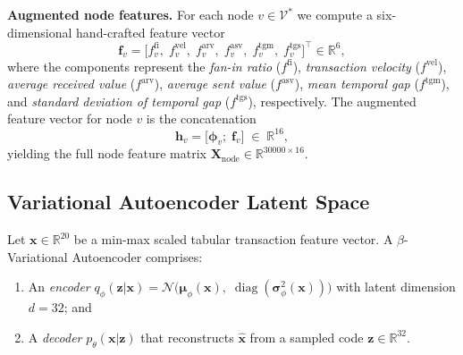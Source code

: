 \noindent\textbf{Augmented node features.}
For each node $v\in\mathcal{V}^{*}$ we compute a six-dimensional hand-crafted
feature vector
\begin{equation}
  \mathbf{f}_{v}
    = \bigl[
        f^{\mathrm{fi}}_v,\;
        f^{\mathrm{vel}}_v,\;
        f^{\mathrm{arv}}_v,\;
        f^{\mathrm{asv}}_v,\;
        f^{\mathrm{tgm}}_v,\;
        f^{\mathrm{tgs}}_v
      \bigr]^{\!\top} \in \mathbb{R}^{6},
  \label{eq:fv}
\end{equation}
where the components represent the \emph{fan-in ratio}
($f^{\mathrm{fi}}$), \emph{transaction velocity}
($f^{\mathrm{vel}}$), \emph{average received value}
($f^{\mathrm{arv}}$), \emph{average sent value}
($f^{\mathrm{asv}}$), \emph{mean temporal gap}
($f^{\mathrm{tgm}}$), and \emph{standard deviation of temporal gap}
($f^{\mathrm{tgs}}$), respectively.
The augmented feature vector for node $v$ is the concatenation
\begin{equation}
  \mathbf{h}_{v}
    = \bigl[\boldsymbol{\phi}_{v};\; \mathbf{f}_{v}\bigr]
    \;\in\; \mathbb{R}^{16},
  \label{eq:hv}
\end{equation}
yielding the full node feature matrix
$\mathbf{X}_{\mathrm{node}}\in\mathbb{R}^{\num{30000}\times 16}$.

\subsection{Variational Autoencoder Latent Space}
\label{subsec:vae}

\begin{definition}
\label{def:vae}
Let $\mathbf{x}\in\mathbb{R}^{20}$ be a min-max scaled tabular transaction
feature vector.  A $\beta$-Variational Autoencoder comprises:
\begin{enumerate}
  \item An \emph{encoder} $q_{\phi}(\mathbf{z}|\mathbf{x}) =
        \mathcal{N}\!\bigl(\boldsymbol{\mu}_{\phi}(\mathbf{x}),\;
        \operatorname{diag}(\boldsymbol{\sigma}^{2}_{\phi}(\mathbf{x}))\bigr)$
        with latent dimension $d=32$; and
  \item A \emph{decoder} $p_{\theta}(\mathbf{x}|\mathbf{z})$ that
        reconstructs $\hat{\mathbf{x}}$ from a sampled code
        $\mathbf{z}\in\mathbb{R}^{32}$.
\end{enumerate}
\end{definition}

